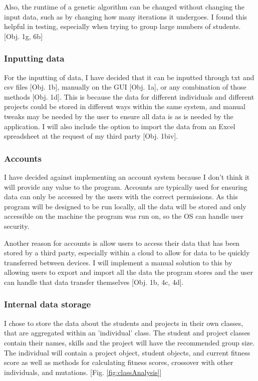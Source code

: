 \documentclass{article}
\begin{document}
Also, the runtime of a genetic algorithm can be changed without changing the input data, such as by changing how many iterations it undergoes. I found this helpful in testing, especially when trying to group large numbers of students. [Obj. 1g, 6b]

\subsubsection{Inputting data}
For the inputting of data, I have decided that it can be inputted through txt and csv files [Obj. 1b], manually  on the GUI [Obj. 1a], or any combination of those methods [Obj. 1d]. This is because the data for different individuals and different projects could be stored in different ways within the same system, and manual tweaks may be needed by the user to ensure all data is as is needed by the application. I will also include the option to import the data from an Excel spreadsheet at the request of my third party [Obj. 1biv].

\subsubsection{Accounts}
I have decided against implementing an account system because I don't think it will provide any value to the program. Accounts are typically used for ensuring data can only be accessed by the users with the correct permissions. As this program will be designed to be run locally, all the data will be stored and only accessible on the machine the program was run on, so the OS can handle user security.

Another reason for accounts is allow users to access their data that has been stored by a third party, especially within a cloud to allow for data to be quickly transferred between devices. I will implement a manual solution to this by allowing users to export and import all the data the program stores and the user can handle that data transfer themselves [Obj. 1b, 4c, 4d].

\subsubsection{Internal data storage}
I chose to store the data about the students and projects in their own classes, that are aggregated within an 'individual' class. The student and project classes contain their names, skills and the project will have the recommended group size. The individual will contain a project object, student objects, and current fitness score as well as methods for calculating fitness scores, crossover with other individuals, and mutations. [Fig. \ref{fig:classAnalysis}]
\end{document}
